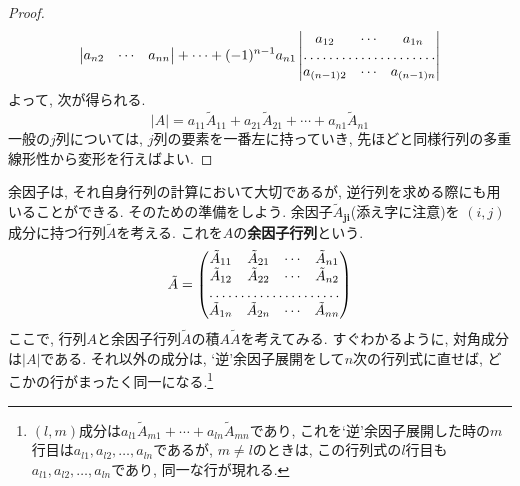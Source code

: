 \documentclass[a4j,dvipdfmx]{jsarticle}
\numberwithin{equation}{section}
\begin{document}
\begin{proof}
\begin{equation*}
\begin{vmatrix}
                        a_{n2} & \cdots & a_{nn}
                    \end{vmatrix}
                    +\cdots
                    +(-1)^{n-1}a_{n1}\begin{vmatrix}
                        a_{12} & \cdots & a_{1n}\\
                        \hdotsfor{3}\\
                        a_{(n-1)2} & \cdots & a_{(n-1)n}\\
                    \end{vmatrix}
                \end{equation*}
                よって, 次が得られる.
                \begin{equation*}
                    |A|=a_{11}\tilde{A}_{11}+a_{21}\tilde{A}_{21} +\cdots+ a_{n1}\tilde{A}_{n1}
                \end{equation*}
                一般の$j$列については, $j$列の要素を一番左に持っていき, 先ほどと同様行列の多重線形性から変形を行えばよい.
            \end{proof}
            余因子は, それ自身行列の計算において大切であるが, 逆行列を求める際にも用いることができる. そのための準備をしよう. 余因子$\tilde{A}_{\bm{j}\bm{i}}$(添え字に注意)を
            $(i,j)$成分に持つ行列$\tilde{A}$を考える. これを$A$の\textbf{余因子行列}という.
            \begin{equation}
                \tilde{A}
                =\begin{pmatrix}
                    \tilde{A}_{11} & \tilde{A}_{21} & \cdots & \tilde{A}_{n1} \\
                    \tilde{A}_{12} & \tilde{A}_{22} & \cdots & \tilde{A}_{n2} \\
                    \hdotsfor{4}\\
                    \tilde{A}_{1n} & \tilde{A}_{2n} & \cdots & \tilde{A}_{nn}    
                \end{pmatrix} \label{eq:線形代数:余因子行列の定義}
            \end{equation}
            ここで, 行列$A$と余因子行列$\tilde{A}$の積$A\tilde{A}$を考えてみる. すぐわかるように, 対角成分は$|A|$である. 
            それ以外の成分は, `逆'余因子展開をして$n$次の行列式に直せば, どこかの行がまったく同一になる.\footnote{$(l,m)$成分は$a_{l1}\tilde{A}_{m1}+\cdots+a_{ln}\tilde{A}_{mn}$であり, これを`逆'余因子展開した時の$m$行目は$a_{l1},a_{l2},\dots,a_{ln}$であるが,
            $m\neq l$のときは, この行列式の$l$行目も$a_{l1},a_{l2},\dots,a_{ln}$であり, 同一な行が現れる.}
\end{document}
